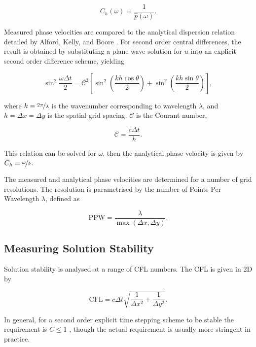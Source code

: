 \documentclass[final-report]{report-template}
\begin{document}
\begin{equation}
    C_h(\omega) = \frac{1}{\hat{p}(\omega)}.
    \label{eq:phase-v}
\end{equation}

Measured phase velocities are compared to the analytical dispersion relation detailed by Alford, Kelly, and Boore \cite{alfordAccuracyFinitedifferenceModeling1974}. For second order central differences, the result is obtained by substituting a plane wave solution for $u$ into an explicit second order difference scheme, yielding

\begin{equation}
    \sin^2{\frac{\omega \Delta t}{2}} = \mathcal{C}^2 \left[ \sin^2\left(\frac{kh\cos\theta}{2}\right) + \sin^2\left(\frac{kh\sin\theta}{2}\right) \right],
\end{equation}

where $k=\nicefrac{2\pi}{\lambda}$ is the wavenumber corresponding to wavelength $\lambda$, and $h=\Delta x = \Delta y$ is the spatial grid spacing. $\mathcal{C}$ is the Courant number,

\begin{equation}
    \mathcal{C} = \frac{c\Delta t}{h}.
\end{equation}

This relation can be solved for $\omega$, then the analytical phase velocity is given by $\tilde{C}_h = \nicefrac{\omega}{k}$. 

The measured and analytical phase velocities are determined for a number of grid resolutions. The resolution is parametrised by the number of Points Per Wavelength $\lambda$, defined as

\begin{equation}
    \text{PPW} = \frac{\lambda}{\max(\Delta x, \Delta y)}.
\end{equation}

\subsection{Measuring Solution Stability}

Solution stability is analysed at a range of CFL numbers. The CFL is given in 2D by

\begin{equation}
    \text{CFL} = c\Delta t\sqrt{\frac{1}{\Delta x^2} + \frac{1}{\Delta y^2}}.
\end{equation}

In general, for a second order explicit time stepping scheme to be stable the requirement is $C \leq 1$ \cite{courantPartialDifferenceEquations1967}, though the actual requirement is usually more stringent in practice.
\end{document}
